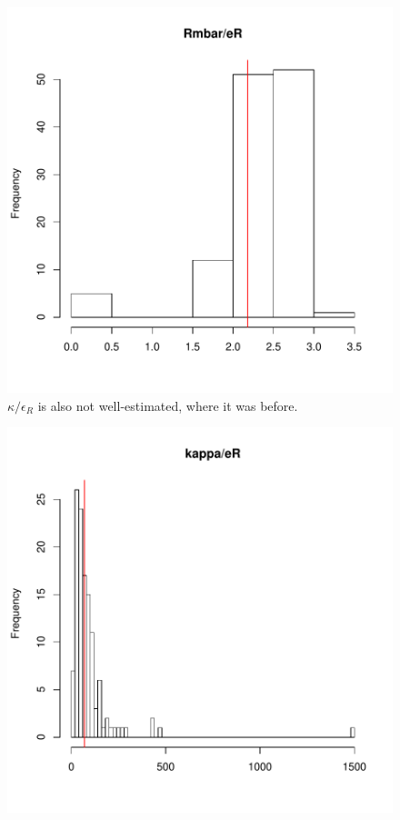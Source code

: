 \documentclass[12pt,reqno,final]{amsart}
\theoremstyle{plain}
\numberwithin{equation}{part}
\begin{document}
\begin{figure}
\includegraphics{Solving_the_problem_of_parameter_covariation_2-006}
\caption{$\kappa/\epsilon_R$ is also not well-estimated, where it was before.}
\end{figure}


\begin{figure}
\includegraphics{Solving_the_problem_of_parameter_covariation_2-007}
\end{figure}
\end{document}
